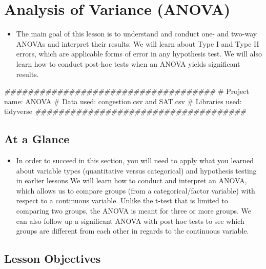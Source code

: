 \documentclass[
  letterpaper,
  DIV=11,
  numbers=noendperiod]{scrreprt}
\newenvironment{Shaded}{\begin{snugshade}}{\end{snugshade}}
\newcommand{\CommentTok}[1]{\textcolor[rgb]{0.37,0.37,0.37}{#1}}
\newcommand{\DocumentationTok}[1]{\textcolor[rgb]{0.37,0.37,0.37}{\textit{#1}}}
\providecommand{\tightlist}{%
  \setlength{\itemsep}{0pt}\setlength{\parskip}{0pt}}\usepackage{longtable,booktabs,array}
\begin{document}

\chapter{Analysis of Variance (ANOVA)}\label{analysis-of-variance-anova}

\begin{itemize}
\tightlist
\item
  The main goal of this lesson is to understand and conduct one- and
  two-way ANOVAs and interpret their results. We will learn about Type I
  and Type II errors, which are applicable forms of error in any
  hypothesis test. We will also learn how to conduct post-hoc tests when
  an ANOVA yields significant results.
\end{itemize}

\begin{Shaded}
\begin{Highlighting}[]
\DocumentationTok{\#\#\#\#\#\#\#\#\#\#\#\#\#\#\#\#\#\#\#\#\#\#\#\#\#\#\#\#\#\#\#\#\#\#\#\#}
\CommentTok{\# Project name: ANOVA}
\CommentTok{\# Data used: congestion.csv and SAT.csv}
\CommentTok{\# Libraries used: tidyverse}
\DocumentationTok{\#\#\#\#\#\#\#\#\#\#\#\#\#\#\#\#\#\#\#\#\#\#\#\#\#\#\#\#\#\#\#\#\#\#\#\#}
\end{Highlighting}
\end{Shaded}

\section{At a Glance}\label{at-a-glance-6}

\begin{itemize}
\tightlist
\item
  In order to succeed in this section, you will need to apply what you
  learned about variable types (quantitative versus categorical) and
  hypothesis testing in earlier lessons We will learn how to conduct and
  interpret an ANOVA, which allows us to compare groups (from a
  categorical/factor variable) with respect to a continuous variable.
  Unlike the t-test that is limited to comparing two groups, the ANOVA
  is meant for three or more groups. We can also follow up a significant
  ANOVA with post-hoc tests to see which groups are different from each
  other in regards to the continuous variable.
\end{itemize}

\section{Lesson Objectives}\label{lesson-objectives-7}
\end{document}
